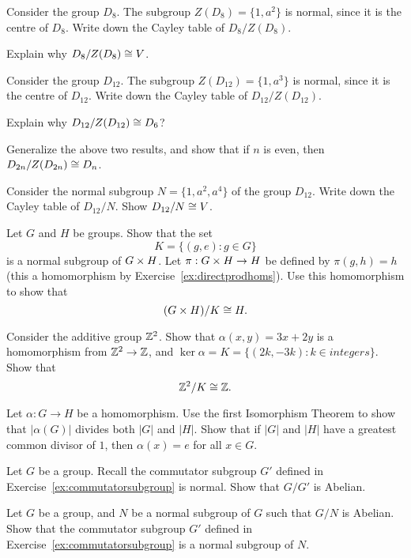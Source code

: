 \begin{exercises}
  \item Consider the group $D_{8}$.  The subgroup $Z(D_{8}) = \{1,
    a^{2}\}$ is normal, since it is the centre of $D_{8}$.  Write down
    the Cayley table of $D_{8}/Z(D_{8})$.
    
    Explain why $D_{8}/Z(D_{8}) \cong V$.
  
  \item Consider the group $D_{12}$.  The subgroup $Z(D_{12}) = \{1,
    a^{3}\}$ is normal, since it is the centre of $D_{12}$.  Write down
    the Cayley table of $D_{12}/Z(D_{12})$.
    
    Explain why $D_{12}/Z(D_{12}) \cong D_{6}$?
  
  \item\label{ex:D2nquotient} Generalize the above two results, and show that if $n$ is 
    even, then $D_{2n}/Z(D_{2n}) \cong D_{n}$.
  
  \item Consider the normal subgroup $N = \{1, a^{2}, a^{4}\}$ of the 
    group $D_{12}$.  Write down the Cayley table of $D_{12}/N$.  Show 
    $D_{12}/N \cong V$.
  
  \item Let $G$ and $H$ be groups.  Show that the set
    \[
      K = \{ (g,e): g \in G \}
    \]
    is a normal subgroup of $G \times H$.  Let $\pi: G \times H \to H$
    be defined by $\pi(g,h) = h$ (this a homomorphism by
    Exercise~\ref{ex:directprodhoms}).  Use this homomorphism to show
    that
    \[
      (G \times H) / K \cong H.
    \]
  
  \item Consider the additive group $\mathbb{Z}^{2}$.  Show that
    $\alpha(x,y) = 3x+2y$ is a homomorphism from $\mathbb{Z}^{2} \to
    \mathbb{Z}$, and $\ker \alpha = K = \{ (2k,-3k) : k \in integers \}$. 
    Show that
    \[
      \mathbb{Z}^{2} / K \cong \mathbb{Z}.
    \]
  
  \item Let $\alpha: G \to H$ be a homomorphism.  Use the first
    Isomorphism Theorem to show that $|\alpha(G)|$ divides both $|G|$ and
    $|H|$.  Show that if $|G|$ and $|H|$ have a greatest common
    divisor of $1$, then $\alpha(x) = e$ for all $x \in G$.
  
  \item Let $G$ be a group.  Recall the commutator subgroup $G'$
    defined in Exercise~\ref{ex:commutatorsubgroup} is normal.  Show
    that $G/G'$ is Abelian.
  
  \item Let $G$ be a group, and $N$ be a normal subgroup of $G$ such 
    that $G/N$ is Abelian.  Show that the commutator subgroup $G'$
    defined in Exercise~\ref{ex:commutatorsubgroup} is a normal subgroup
    of $N$.
\end{exercises}


